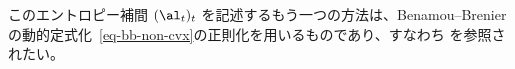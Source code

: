 このエントロピー補間 $(\al_t)_t$ を記述するもう一つの方法は、Benamou--Brenierの動的定式化~\eqref{eq-bb-non-cvx}の正則化を用いるものであり、すなわち 
\citep{gentil2015analogy,chen2016relation}を参照されたい。


